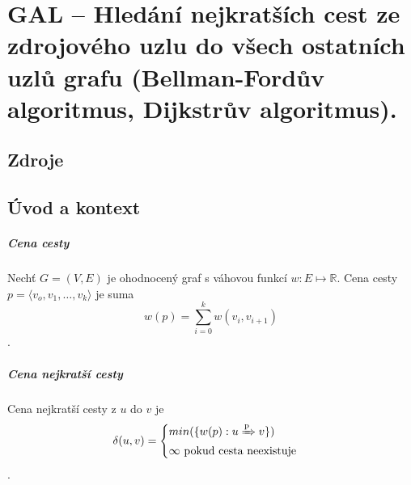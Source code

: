

\graphicspath{{gal/hledani_nejkratsich_cest/figures}}


\chapter{GAL -- Hledání nejkratších cest ze zdrojového uzlu do všech ostatních uzlů grafu (Bellman-Fordův algoritmus, Dijkstrův algoritmus).}


\section{Zdroje}

\begin{compactitem}
    \item {}
    \item {}
\end{compactitem}


\section{Úvod a kontext}

\paragraph*{Cena cesty} Nechť $G = (V, E)$ je ohodnocený graf s váhovou funkcí $w: E \mapsto \mathbb{R}$. Cena cesty $p = \langle v_o, v_1, \dots, v_k \rangle$ je suma $$
w(p) = \sum_{i=0}^k w(v_i, v_{i+1})
$$.

\paragraph*{Cena nejkratší cesty} Cena nejkratší cesty z $u$ do $v$ je $$
\delta(u, v) = \begin{cases}
    min( \{ w(p) : u \xRightarrow{\text{p}} v \} ) \\
    \infty \text{   pokud cesta neexistuje}
\end{cases}
$$.

